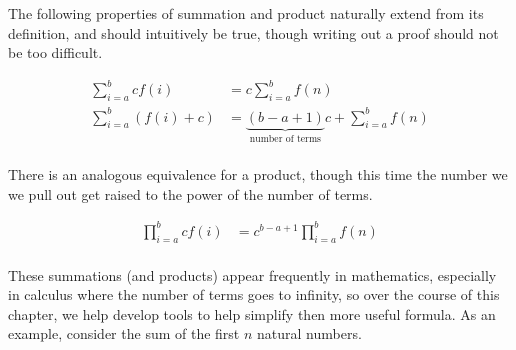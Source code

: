 The following properties of summation and product naturally extend from its definition, and should intuitively be true, though writing out a proof should not be too difficult.

\begin{align*}
	\sum_{i = a}^b cf(i) &= c \sum_{i = a}^b f(n) \\
	\sum_{i = a}^b (f(i) + c) &= \underbrace{(b - a + 1)}_\text{number of terms}c + \sum_{i = a}^b f(n) \\
\end{align*}

There is an analogous equivalence for a product, though this time the number we we pull out get raised to the power of the number of terms.

\begin{align*}
	\prod_{i = a}^b cf(i) &= c^{b - a + 1} \prod_{i = a}^b f(n) \\
\end{align*}

These summations (and products) appear frequently in mathematics, especially in calculus where the number of terms goes to infinity, so over the course of this chapter, we help develop tools to help simplify then more useful formula. As an example, consider the sum of the first $n$ natural numbers.

